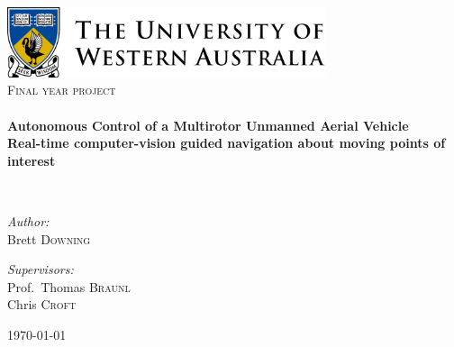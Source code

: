 
\begin{titlepage}
\begin{center}

\includegraphics[width=0.7\textwidth]{./logo.png}~\\[1cm]

\textsc{\Large Final year project}\\[0.5cm]

\HRule \\[0.4cm]
{ \huge \bfseries Autonomous Control of a Multirotor Unmanned Aerial Vehicle\\
Real-time computer-vision guided navigation about moving points of interest \\[0.4cm] }

\HRule \\[1.5cm]

\noindent
\begin{minipage}[t]{0.4\textwidth}
\begin{flushleft} \large
\emph{Author:}\\
Brett \textsc{Downing}
\end{flushleft}
\end{minipage}%
\begin{minipage}[t]{0.4\textwidth}
\begin{flushright} \large
\emph{Supervisors:} \\
Prof.~Thomas \textsc{Braunl}\\
Chris \textsc{Croft}
\end{flushright}
\end{minipage}

\vfill

{\large \today}

\end{center}
\end{titlepage}